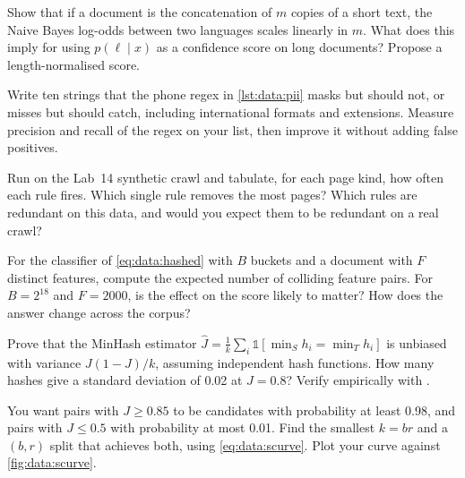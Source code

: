 \begin{exercise}
Show that if a document is the concatenation of $m$ copies of a short text, the Naive Bayes
log-odds between two languages scales linearly in $m$. What does this imply for using
$p(\ell\mid x)$ as a confidence score on long documents? Propose a length-normalised score.
\end{exercise}

\begin{exercise}
Write ten strings that the phone regex in \cref{lst:data:pii} masks but should not, or misses
but should catch, including international formats and extensions. Measure precision and recall
of the regex on your list, then improve it without adding false positives.
\end{exercise}

\begin{exercise}
Run  on the Lab~14 synthetic crawl and tabulate, for each page kind, how
often each rule fires. Which single rule removes the most pages? Which rules are redundant on
this data, and would you expect them to be redundant on a real crawl?
\end{exercise}

\begin{exercise}
For the classifier of \cref{eq:data:hashed} with $B$ buckets and a document with $F$ distinct
features, compute the expected number of colliding feature pairs. For $B=2^{18}$ and $F=2000$, is
the effect on the score likely to matter? How does the answer change across the corpus?
\end{exercise}

\begin{exercise}
Prove that the MinHash estimator $\hat J = \frac1k\sum_i \mathbb{1}[\min_S h_i=\min_T h_i]$ is
unbiased with variance $J(1-J)/k$, assuming independent hash functions. How many hashes give a
standard deviation of 0.02 at $J=0.8$? Verify empirically with .
\end{exercise}

\begin{exercise}
You want pairs with $J\ge0.85$ to be candidates with probability at least 0.98, and pairs with
$J\le0.5$ with probability at most 0.01. Find the smallest $k=br$ and a $(b,r)$ split that achieves
both, using \cref{eq:data:scurve}. Plot your curve against \cref{fig:data:scurve}.
\end{exercise}

